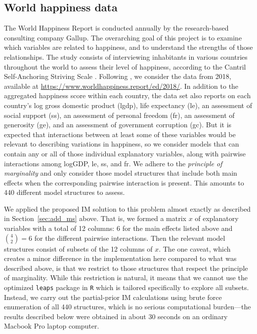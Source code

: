 \documentclass[12pt]{article}
\begin{document}
\subsection{World happiness data}

The World Happiness Report is conducted annually by the research-based consulting company Gallup.  The overarching goal of this project is to examine which variables are related to happiness, and to understand the strengths of those relationships.  The study consists of interviewing inhabitants in various countries throughout the world to assess their level of happiness, according to the Cantril Self-Anchoring Striving Scale \citep{glatzer2014}.  Following \citet{bergh.etal.2021}, we consider the data from 2018, available at \url{https://www.worldhappiness.report/ed/2018/}.  In addition to the aggregated happiness score within each country, the data set also reports on each country's log gross domestic product (lgdp), life expectancy (le), an assessment of social support (ss), an assessment of personal freedom (fr), an assessment of generosity (ge), and an assessment of government corruption (gc).  But it is expected that interactions between at least some of these variables would be relevant to describing variations in happiness, so we consider models that can contain any or all of those individual explanatory variables, along with pairwise interactions among logGDP, le, ss, and fr.  We adhere to the {\em principle of marginality} and only consider those model structures that include both main effects when the corresponding pairwise interaction is present.  This amounts to 440 different model structures to assess.

We applied the proposed IM solution to this problem almost exactly as described in Section~\ref{sec:add_ms} above.  That is, we formed a matrix $x$ of explanatory variables with a total of 12 columns: 6 for the main effects listed above and $\binom{4}{2}=6$ for the different pairwise interactions.  Then the relevant model structures consist of subsets of the 12 columns of $x$.  The one caveat, which creates a minor difference in the implementation here compared to what was described above, is that we restrict to those structures that respect the principle of marginality.  While this restriction is natural, it means that we cannot use the optimized {\tt leaps} package in \verb|R| which is tailored specifically to explore all subsets.  Instead, we carry out the partial-prior IM calculations using brute force enumeration of all 440 structures, which is no serious computational burden---the results described below were obtained in about 30 seconds on an ordinary Macbook Pro laptop computer.  
\end{document}
